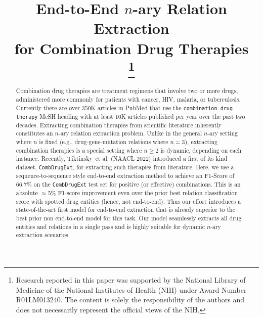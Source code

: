 \documentclass[conference]{IEEEtran}
\begin{document}
\title{ End-to-End  $n$-ary Relation Extraction \\ for Combination Drug Therapies\\

\thanks{Research reported in this paper was supported by the National Library of Medicine of the National Institutes of Health (NIH) under Award Number R01LM013240. The content is solely the responsibility of the authors and does not necessarily represent the official views of the NIH.}
}

\author{
\and
{}
}

\maketitle

\begin{abstract}
Combination drug therapies are treatment regimens that involve two or more drugs, administered more commonly for patients with cancer, HIV, malaria, or tuberculosis. Currently there are over 350K articles in PubMed that use the {\color{blue} \texttt{combination drug therapy}} MeSH heading with at least 10K articles published per year over the past two decades. Extracting combination therapies from scientific literature inherently constitutes an  $n$-ary relation extraction problem. Unlike in the general $n$-ary setting where $n$ is fixed (e.g., drug-gene-mutation relations where $n=3$),  extracting combination therapies is a special setting where $n \geq 2$ is dynamic, depending on each instance. Recently, Tiktinsky~et al. (NAACL 2022) introduced a first of its kind dataset, \texttt{CombDrugExt}, for extracting such therapies from literature. Here, we use a sequence-to-sequence style end-to-end extraction method to achieve an F1-Score of $66.7\%$ on the \texttt{CombDrugExt} test set for positive (or effective) combinations. This is an absolute $\approx 5\%$ F1-score improvement even over the prior best relation classification  score with spotted drug entities (hence, not end-to-end). Thus our effort introduces a state-of-the-art first model for end-to-end extraction that is already superior to the best prior non end-to-end model for this task. Our model seamlessly extracts all drug entities and relations in a single pass and is highly suitable for dynamic $n$-ary extraction scenarios. 

\end{abstract}
\end{document}
